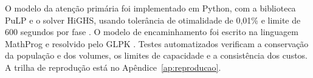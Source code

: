 O modelo da atenção primária foi implementado em Python, com a biblioteca PuLP e o solver HiGHS, usando
tolerância de otimalidade de 0,01\% e limite de 600 segundos por fase \citep{mitchell2011,huangfu2018}. O
modelo de encaminhamento foi escrito na linguagem MathProg e resolvido pelo GLPK \citep{glpk}. Testes
automatizados verificam a conservação da população e dos volumes, os limites de capacidade e a
consistência dos custos. A trilha de reprodução está no Apêndice~\ref{ap:reproducao}.
